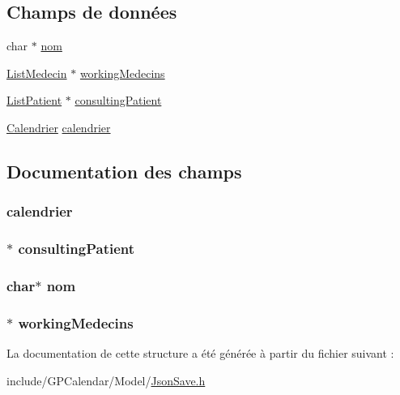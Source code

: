 \subsection*{Champs de données}
\begin{DoxyCompactItemize}
\item 
char $\ast$ \hyperlink{struct_project_abe308d273ff51ad86ff02ef3ba3b6f0e}{nom}
\item 
\hyperlink{struct_list_medecin}{List\-Medecin} $\ast$ \hyperlink{struct_project_ad698f4218c3645e84ec3b943db9ea06d}{working\-Medecins}
\item 
\hyperlink{struct_list_patient}{List\-Patient} $\ast$ \hyperlink{struct_project_a5a3570c43d186ae075a0d893438ce8b4}{consulting\-Patient}
\item 
\hyperlink{calendrier_8h_ab8644d1026df84be3eb3190cf1ef29fa}{Calendrier} \hyperlink{struct_project_ac1c68d1c7eeee118cba12c3efab5fd3f}{calendrier}
\end{DoxyCompactItemize}


\subsection{Documentation des champs}
\hypertarget{struct_project_ac1c68d1c7eeee118cba12c3efab5fd3f}{
\subsubsection[{calendrier}]{ calendrier}}\label{struct_project_ac1c68d1c7eeee118cba12c3efab5fd3f}
\hypertarget{struct_project_a5a3570c43d186ae075a0d893438ce8b4}{
\subsubsection[{consulting\-Patient}]{$\ast$ consulting\-Patient}}\label{struct_project_a5a3570c43d186ae075a0d893438ce8b4}
\hypertarget{struct_project_abe308d273ff51ad86ff02ef3ba3b6f0e}{
\subsubsection[{nom}]{\setlength{\rightskip}{0pt plus 5cm}char$\ast$ nom}}\label{struct_project_abe308d273ff51ad86ff02ef3ba3b6f0e}
\hypertarget{struct_project_ad698f4218c3645e84ec3b943db9ea06d}{
\subsubsection[{working\-Medecins}]{$\ast$ working\-Medecins}}\label{struct_project_ad698f4218c3645e84ec3b943db9ea06d}


La documentation de cette structure a été générée à partir du fichier suivant \-:\begin{DoxyCompactItemize}
\item 
include/\-G\-P\-Calendar/\-Model/\hyperlink{_json_save_8h}{Json\-Save.\-h}\end{DoxyCompactItemize}
